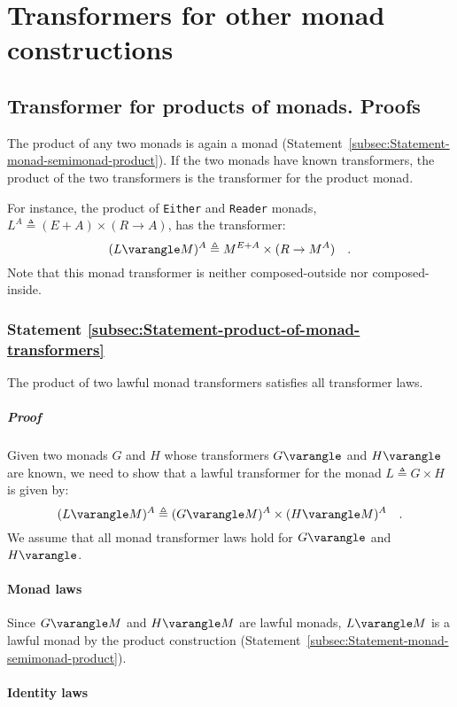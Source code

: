 \section{Transformers for other monad constructions}

\subsection{Transformer for products of monads. Proofs}

The product of any two monads is again a monad (Statement~\ref{subsec:Statement-monad-semimonad-product}).
If the two monads have known transformers, the product of the two
transformers is the transformer for the product monad. 

For instance, the product of \lstinline!Either! and \lstinline!Reader!
monads, $L^{A}\triangleq(E+A)\times(R\rightarrow A)$, has the transformer:
\[
(L\varangle M)^{A}\triangleq M^{E+A}\times(R\rightarrow M^{A})\quad.
\]
Note that this monad transformer is neither composed-outside nor composed-inside.

\subsubsection{Statement \label{subsec:Statement-product-of-monad-transformers}\ref{subsec:Statement-product-of-monad-transformers}}

The product of two lawful monad transformers satisfies all transformer
laws.

\subparagraph{Proof}

Given two monads $G$ and $H$ whose transformers $G\varangle$ and
$H\varangle$ are known, we need to show that a lawful transformer
for the monad $L\triangleq G\times H$ is given by:
\[
(L\varangle M)^{A}\triangleq(G\varangle M)^{A}\times(H\varangle M)^{A}\quad.
\]
We assume that all monad transformer laws hold for $G\varangle$ and
$H\varangle$.

\paragraph{Monad laws}

Since $G\varangle M$ and $H\varangle M$ are lawful monads, $L\varangle M$
is a lawful monad by the product construction (Statement~\ref{subsec:Statement-monad-semimonad-product}).

\paragraph{Identity laws}

